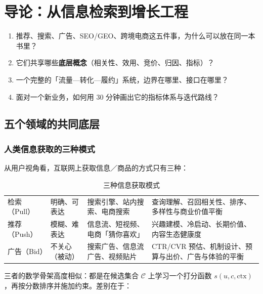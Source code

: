 \chapter{导论：从信息检索到增长工程}
\label{ch:overview}

\begin{insight}[本章要解决的问题]
\begin{enumerate}
  \item 推荐、搜索、广告、SEO/GEO、跨境电商这五件事，为什么可以放在同一本书里？
  \item 它们共享哪些\textbf{底层概念}（相关性、效用、竞价、归因、指标）？
  \item 一个完整的「流量—转化—履约」系统，边界在哪里、接口在哪里？
  \item 面对一个新业务，如何用 30 分钟画出它的指标体系与迭代路线？
\end{enumerate}
\end{insight}

\section{五个领域的共同底层}

\subsection{人类信息获取的三种模式}

从用户视角看，互联网上获取信息／商品的方式只有三种：

\begin{table}[htbp]
\centering
\caption{三种信息获取模式}
\label{tab:three-modes}
\small
\begin{tabularx}{\textwidth}{L{2.2cm} L{2.7cm} L{3.0cm} Y}
\toprule
{} &  &  &  \\
\midrule
检索（Pull） & 明确、可表达 & 搜索引擎、站内搜索、电商搜索 &
查询理解、召回相关性、排序、多样性与商业价值平衡 \\
\addlinespace
推荐（Push） & 模糊、难表达 & 信息流、短视频、电商「猜你喜欢」 &
兴趣建模、冷启动、长期价值、内容生态健康度 \\
\addlinespace
广告（Bid） & 不关心（被动） & 搜索广告、信息流广告、视频贴片 &
CTR/CVR 预估、机制设计、预算与出价、广告与体验的平衡 \\
\bottomrule
\end{tabularx}
\end{table}

三者的数学骨架高度相似：都是在候选集合 $\mathcal{C}$ 上学习一个打分函数
$s(u, c, \text{ctx})$，再按分数排序并施加约束。差别在于：

